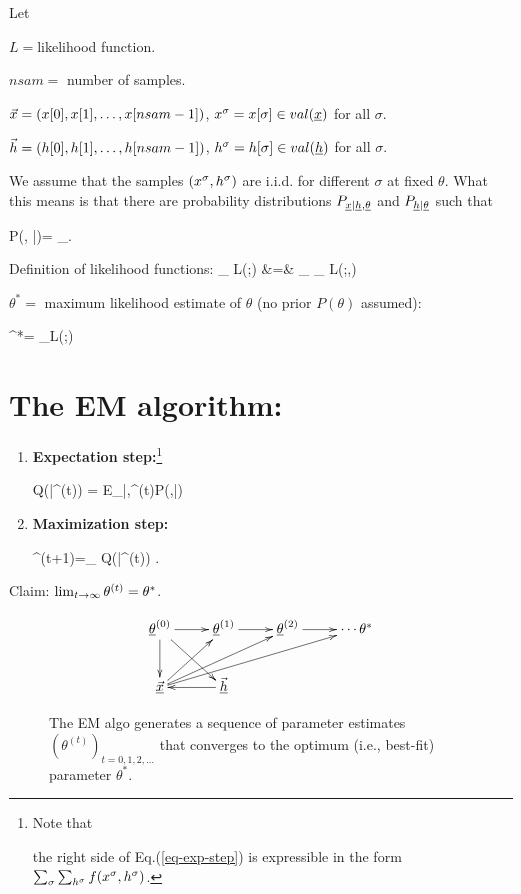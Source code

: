 Let

$ L=$likelihood
function.

$nsam=$ number of samples.

${\vec{x}}=(x[0], x[1], \ldots, x[nsam-1])$,
 $x^\s=x[\s]\in val(\rvx)$ for all $\sigma$.

${\vec{h}}=(h[0], h[1], \ldots, h[nsam-1])$,
$h^\s=h[\s]\in val(\rvh)$ for all $\sigma$.

We assume that the samples $(x^\sigma,h^\sigma)$
are i.i.d. for different $\sigma$ at fixed
$\theta$.
What this means is that
there are
probability distributions
$P_{\rvx|\rvh,\ul{\theta}}$
and $P_{\rvh|\ul{\theta}}$
such that

\beq
P(\vecx, \vech|\theta)=
\prod_\sigma {}
\;.
\eeq

Definition of likelihood functions:
\beqa
{}
_{ L(\theta;\vecx)}
&=&
\sum_{\vech}
_{ L(\theta;\vecx,\vech)}
\eeqa


$\theta^*=$ maximum likelihood
estimate of $\theta$ (no prior $P(\theta)$
assumed):

\beq
\theta^*=
\argmax_\theta L(\theta;\vecx)
\eeq

\section{The EM algorithm:}
\begin{enumerate}
\item{\bf Expectation step:}\footnote{
Note that

the right side of
Eq.(\ref{eq-exp-step})
is expressible
in the form $\sum_\sigma
\sum_{h^\sigma}f(x^\sigma,
h^\sigma)$.}

\beq
Q(\theta|\theta^{(t)})
=
E_{\vech|\vecx,\theta^{(t)}}\ln P(\vecx,\vech|\theta)
\label{eq-exp-step}
\eeq

\item{\bf Maximization step:}

\beq
\theta^{(t+1)}=\argmax_\theta
Q(\theta|\theta^{(t)})
\label{eq-maxi-step}
\;.
\eeq
\end{enumerate}


Claim: $\lim_{t\rightarrow \infty}
\theta^{(t)}=\theta^*$.

\begin{figure}[h!]
$$\xymatrix{
\ul{\theta}^{(0)}\ar[d]\ar[dr]\ar[r]
&\ul{\theta}^{(1)}\ar[r]
&\ul{\theta}^{(2)}\ar[r]
&\cdots\theta^*
\\
\ul{\vecx}\ar[ru]\ar[rru]\ar[urrr]
&\ul{\vech}\ar[l]
}$$
\caption{
The EM algo generates
a sequence of
parameter estimates
$(\theta^{(t)})_{t=0, 1,2, \ldots}$
that converges to the optimum (i.e.,
best-fit) parameter $\theta^*$.
}
\label{fig-emax-dynamical-bnet}
\end{figure}

